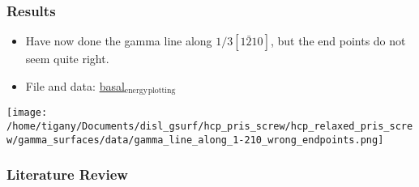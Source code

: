 \documentclass[11pt]{article}
\begin{document}
\subsubsection{Results}
\label{sec-2-2-4}
\begin{itemize}
\item Have now done the gamma line along $1/3[1\bar{2}10]$, but the end points
do not seem quite right.
\item File and data: \href{file:///home/tigany/Documents/disl_gsurf/hcp_pris_screw/hcp_relaxed_pris_screw/gamma_surfaces/data/plot_hsbc_pkl.py}{basal$_{\text{energy}}$$_{\text{plotting}}$}
\end{itemize}
\texttt{[image: /home/tigany/Documents/disl\_gsurf/hcp\_pris\_screw/hcp\_relaxed\_pris\_screw/gamma\_surfaces/data/gamma\_line\_along\_1-210\_wrong\_endpoints.png]} 

\subsubsection{Literature Review}
\label{sec-2-2-5}
\end{document}

